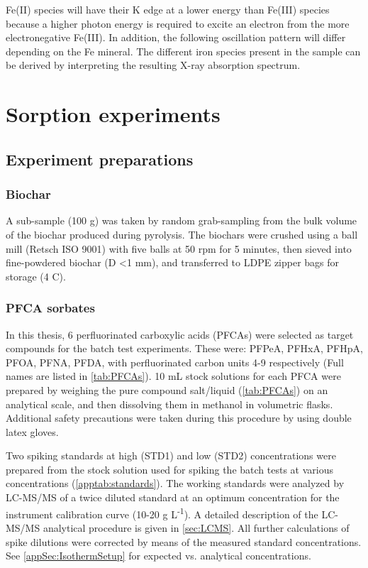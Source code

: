 Fe(II) species will have their K edge at a lower energy than Fe(III) species because a higher photon energy is required to excite an electron from the more electronegative Fe(III). In addition, the following oscillation pattern will differ depending on the Fe mineral. The different iron species present in the sample can be derived by interpreting the resulting X-ray absorption spectrum.


\section{Sorption experiments}
\subsection{Experiment preparations}
\subsubsection{Biochar}
A sub-sample (100 g) was taken by random grab-sampling from the bulk volume of the biochar produced during pyrolysis. The biochars were crushed using a ball mill (Retsch ISO 9001) with five balls at 50 rpm for 5 minutes, then sieved into fine-powdered biochar (D \textless 1 mm), and transferred to LDPE zipper bags for storage (4 \textdegree C). 

\subsubsection{PFCA sorbates}\label{sec:PFCAanalytic}
In this thesis, 6 perfluorinated carboxylic acids (PFCAs) were selected as target compounds for the batch test experiments. These were: PFPeA, PFHxA, PFHpA, PFOA, PFNA, PFDA, with perfluorinated carbon units 4-9 respectively (Full names are listed in \cref{tab:PFCAs}). 10 mL stock solutions for each PFCA were prepared by weighing the pure compound salt/liquid (\cref{tab:PFCAs}) on an analytical scale, and then dissolving them in methanol in volumetric flasks. Additional safety precautions were taken during this procedure by using double latex gloves. 

Two spiking standards at high (STD1) and low (STD2) concentrations were prepared from the stock solution used for spiking the batch tests at various concentrations (\cref{apptab:standards}). The working standards were analyzed by LC-MS/MS of a twice diluted standard at an optimum concentration for the instrument calibration curve (10-20 \textmu g L\textsuperscript{-1}). A detailed description of the LC-MS/MS analytical procedure is given in \cref{sec:LCMS}. All further calculations of spike dilutions were corrected by means of the measured standard concentrations. See \cref{appSec:IsothermSetup} for expected vs. analytical concentrations. 

